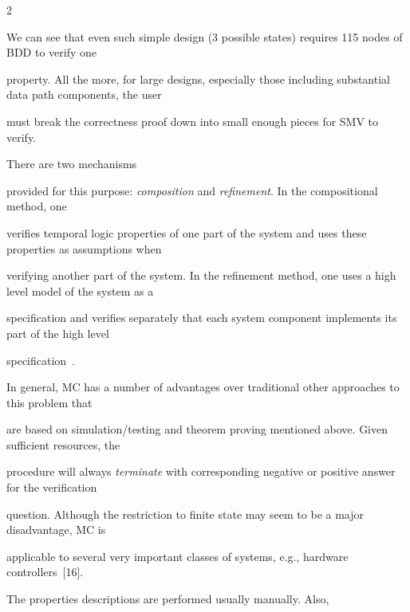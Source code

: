 \begin{multicols}{2}
\begin{figure}
{\label{f4bar}}


\end{figure}








   We can see that even such simple design (3 possible states) requires 115 nodes of BDD to verify one


property. All the more, for large designs, especially those including substantial data path components, the user


must break the correctness proof down into small enough pieces for SMV to verify. 





There are two mechanisms


provided for this purpose: \textit{composition} and \textit{refinement}. In the compositional method, one


verifies temporal logic properties of one part of the system and uses these properties as assumptions when


verifying another part of the system. In the refinement method, one uses a high level model of the system as a


specification and verifies separately that each system component implements its part of the high level


specification~\cite{10bar}.





In general, MC has a number of advantages over traditional other approaches to this problem that


are based on simulation/testing and theorem proving mentioned above. Given sufficient resources, the


procedure will always \textit{terminate} with corresponding negative or positive answer for the verification


question. Although the restriction to finite state may seem to be a major disadvantage, MC is


applicable to several very important classes of systems, e.g., hardware controllers~[16].


{





}





The properties descriptions are performed usually manually. Also,



\end{multicols}
